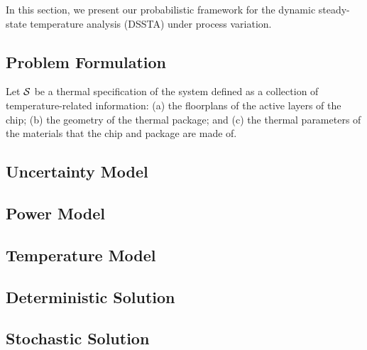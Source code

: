 In this section, we present our probabilistic framework for the dynamic steady-state temperature analysis (DSSTA) under process variation.

\subsection{Problem Formulation} 
Let $\mathcal{S}$ be a thermal specification of the system defined as a collection of temperature-related information: (a) the floorplans of the active layers of the chip; (b) the geometry of the thermal package; and (c) the thermal parameters of the materials that the chip and package are made of.

\subsection{Uncertainty Model}


\subsection{Power Model}


\subsection{Temperature Model}


\subsection{Deterministic Solution}


\subsection{Stochastic Solution}
